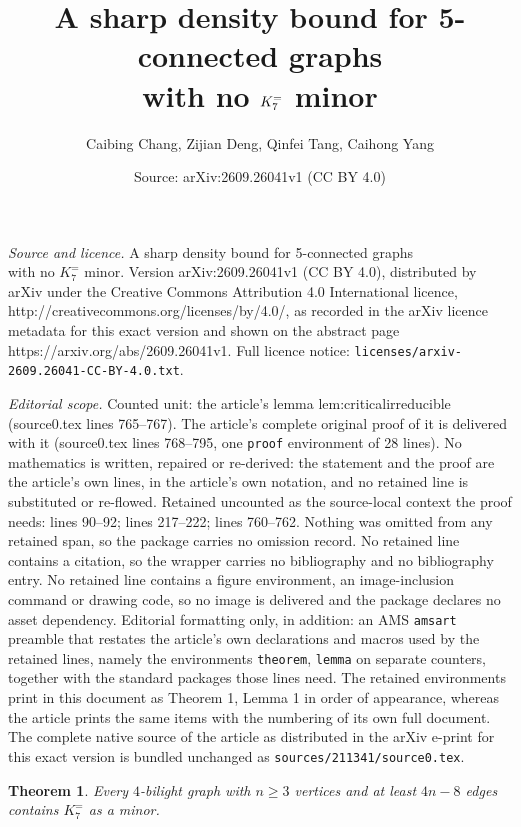 \documentclass[10pt,a4paper]{amsart}
\title{A sharp density bound for 5-connected graphs\\with no $\Ke$ minor}
\author{Caibing Chang, Zijian Deng, Qinfei Tang, Caihong Yang}
\date{Source: arXiv:2609.26041v1 (CC BY 4.0)}
\newtheorem{theorem}{Theorem}
\newcommand{\Ke}{K_7^{=}}
\begin{document}
\maketitle

\noindent\emph{Source and licence.} A sharp density bound for 5-connected graphs\\with no $\Ke$ minor. Version arXiv:2609.26041v1 (CC BY 4.0), distributed by arXiv under the Creative Commons Attribution 4.0 International licence, http://creativecommons.org/licenses/by/4.0/, as recorded in the arXiv licence metadata for this exact version and shown on the abstract page https://arxiv.org/abs/2609.26041v1. Full licence notice: \texttt{licenses/arxiv-2609.26041-CC-BY-4.0.txt}.\par\smallskip

\noindent\textit{Editorial scope.} Counted unit: the article's lemma lem:criticalirreducible (source0.tex lines 765--767). The article's complete original proof of it is delivered with it (source0.tex lines 768--795, one \texttt{proof} environment of 28 lines). No mathematics is written, repaired or re-derived: the statement and the proof are the article's own lines, in the article's own notation, and no retained line is substituted or re-flowed.  Retained uncounted as the source-local context the proof needs: lines 90--92; lines 217--222; lines 760--762.  Nothing was omitted from any retained span, so the package carries no omission record.  No retained line contains a citation, so the wrapper carries no bibliography and no bibliography entry.  No retained line contains a figure environment, an image-inclusion command or drawing code, so no image is delivered and the package declares no asset dependency.  Editorial formatting only, in addition: an AMS \texttt{amsart} preamble that restates the article's own declarations and macros used by the retained lines, namely the environments \texttt{theorem}, \texttt{lemma} on separate counters, together with the standard packages those lines need.  The retained environments print in this document as Theorem 1, Lemma 1 in order of appearance, whereas the article prints the same items with the numbering of its own full document.  The complete native source of the article as distributed in the arXiv e-print for this exact version is bundled unchanged as \texttt{sources/211341/source0.tex}.
\begin{theorem}\label{thm:aux}
Every $4$-bilight graph with $n\ge3$ vertices and at least $4n-8$ edges contains $\Ke$ as a minor.
\end{theorem}
\end{document}
